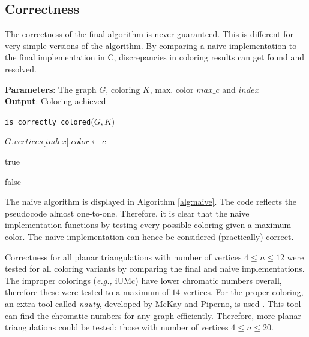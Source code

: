 \documentclass{article}
\begin{document}
\subsection{Correctness}
\label{sec:correctness}

The correctness of the final algorithm is never guaranteed. This is different for very simple versions of the algorithm. By comparing a naive implementation to the final implementation in C, discrepancies in coloring results can get found and resolved. 

\begin{algorithm}[tb]
	\caption{\texttt{can\_color\_with\_max\_c\_naive}}
	\label{alg:naive}
	\textbf{Parameters}: The graph $G$, coloring $K$, max. color $max\_c$ and $index$ \\
	\textbf{Output}: Coloring achieved
	\begin{algorithmic}[1]
		
		\RETURN \texttt{is\_correctly\_colored}($G, K$)
		\ENDIF
		
		
		\STATE $G.vertices$[$index$]$.color \gets c$
		
		
		\RETURN true
		
		\ENDIF
		
		\ENDFOR
		
		\RETURN false
	\end{algorithmic}
\end{algorithm}

The naive algorithm is displayed in Algorithm \ref{alg:naive}. The code reflects the pseudocode almost one-to-one. Therefore, it is clear that the naive implementation functions by testing every possible coloring given a maximum color. The naive implementation can hence be considered (practically) correct.

Correctness for all planar triangulations with number of vertices $4 \le n \le 12$ were tested for all coloring variants by comparing the final and naive implementations. The improper colorings (\textit{e.g., $\mathrm{iUMc}$}) have lower chromatic numbers overall, therefore these were tested to a maximum of $14$ vertices.
For the proper coloring, an extra tool called \textit{nauty}, developed by McKay and Piperno, is used \cite{mckay2014practical}. This tool can find the chromatic numbers for any graph efficiently. Therefore, more planar triangulations could be tested: those with number of vertices $4 \le n \le 20$.
\end{document}
